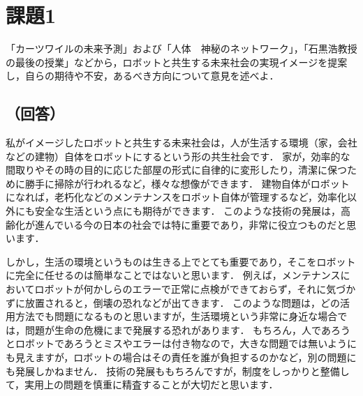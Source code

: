 \section*{課題1}
「カーツワイルの未来予測」および「人体　神秘のネットワーク」，「石黒浩教授の最後の授業」などから，ロボットと共生する未来社会の実現イメージを提案し，自らの期待や不安，あるべき方向について意見を述べよ．

\subsection*{（回答）}
私がイメージしたロボットと共生する未来社会は，人が生活する環境（家，会社などの建物）自体をロボットにするという形の共生社会です．
家が，効率的な間取りやその時の目的に応じた部屋の形式に自律的に変形したり，清潔に保つために勝手に掃除が行われるなど，様々な想像ができます．
建物自体がロボットになれば，老朽化などのメンテナンスをロボット自体が管理するなど，効率化以外にも安全な生活という点にも期待ができます．
このような技術の発展は，高齢化が進んでいる今の日本の社会では特に重要であり，非常に役立つものだと思います．

しかし，生活の環境というものは生きる上でとても重要であり，そこをロボットに完全に任せるのは簡単なことではないと思います．
例えば，メンテナンスにおいてロボットが何かしらのエラーで正常に点検ができておらず，それに気づかずに放置されると，倒壊の恐れなどが出てきます．
このような問題は，どの活用方法でも問題になるものと思いますが，生活環境という非常に身近な場合では，問題が生命の危機にまで発展する恐れがあります．
もちろん，人であろうとロボットであろうとミスやエラーは付き物なので，大きな問題では無いようにも見えますが，ロボットの場合はその責任を誰が負担するのかなど，別の問題にも発展しかねません．
技術の発展ももちろんですが，制度をしっかりと整備して，実用上の問題を慎重に精査することが大切だと思います．
